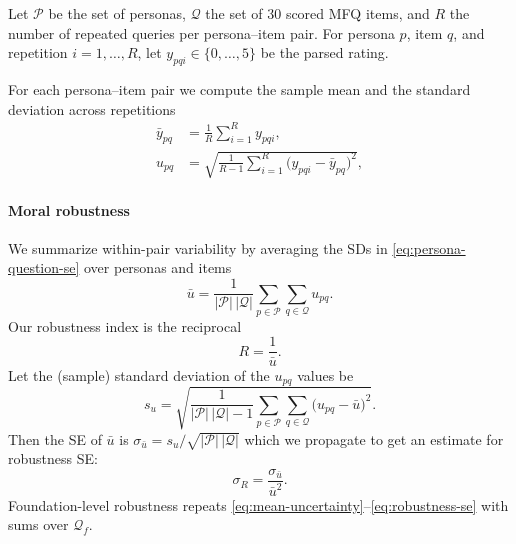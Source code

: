 \documentclass{article}
\begin{document}
Let \(\mathcal{P}\) be the set of personas, \(\mathcal{Q}\) the set of 30 scored MFQ items, and \(R\) the number of repeated queries per persona--item pair. For persona \(p\), item \(q\), and repetition \(i=1,\ldots,R\), let \(y_{pqi}\in\{0,\ldots,5\}\) be the parsed rating.

For each persona--item pair we compute the sample mean and the standard deviation across repetitions
\begin{align}
  \bar{y}_{pq} &= \frac{1}{R} \sum_{i=1}^{R} y_{pqi}, \label{eq:persona-question-mean}\\
  u_{pq} &= \sqrt{\frac{1}{R-1} \sum_{i=1}^{R} \big(y_{pqi} - \bar{y}_{pq}\big)^2}, \label{eq:persona-question-se}
\end{align}

\paragraph{Moral robustness} We summarize within-pair variability by averaging the SDs in \eqref{eq:persona-question-se} over personas and items
\begin{equation}
  \bar{u} = \frac{1}{|\mathcal{P}|\,|\mathcal{Q}|} \sum_{p \in \mathcal{P}} \sum_{q \in \mathcal{Q}} u_{pq}.\label{eq:mean-uncertainty}
\end{equation}
Our robustness index is the reciprocal
\begin{equation}
  R = \frac{1}{\bar{u}}.\label{eq:robustness}
\end{equation}
Let the (sample) standard deviation of the \(u_{pq}\) values be
\begin{equation}
  s_u = \sqrt{\frac{1}{|\mathcal{P}|\,|\mathcal{Q}| - 1} \sum_{p \in \mathcal{P}} \sum_{q \in \mathcal{Q}} \Big(u_{pq} - \bar{u}\Big)^2}.\label{eq:uncertainty-sd}
\end{equation}
Then the SE of \(\bar{u}\) is \(\sigma_{\bar{u}} = s_u / \sqrt{|\mathcal{P}|\,|\mathcal{Q}|}\) which we propagate to get an estimate for robustness SE:
\begin{equation}
  \sigma_R = \frac{\sigma_{\bar{u}}}{\bar{u}^2}.
  \label{eq:robustness-se}
\end{equation}
Foundation-level robustness repeats \eqref{eq:mean-uncertainty}--\eqref{eq:robustness-se} with sums over \(\mathcal{Q}_f\).
\end{document}

